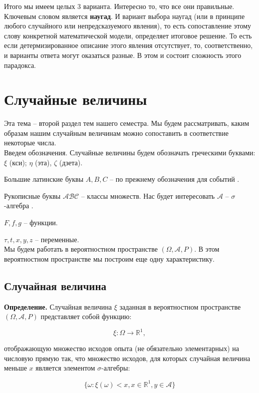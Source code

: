 \documentclass{article}
\begin{document}
\quad

Итого мы имеем целых 3 варианта. Интересно то, что все они правильные. Ключевым словом является \textbf{наугад}. И вариант выбора наугад (или в принципе любого случайного или непредсказуемого явления), то есть сопоставление этому слову конкретной математической модели, определяет итоговое решение. То есть если детермизированное описание этого явления отсутствует, то, соответственно, и варианты ответа могут оказаться разные. В этом и состоит сложность этого парадокса.

\section{Случайные величины}

Эта тема -- второй раздел тем нашего семестра. Мы будем рассматривать, каким образам нашим случайным величинам можно сопоставить в соответствие некоторые числа.
\\

Введем обозначения. Случайные величины будем обозначать греческими буквами: $\xi$ (кси); $\eta $ (эта), $\zeta $ (дзета).

Большие латинские буквы $A, B, C$ -- по прежнему обозначения для событий  .

Рукописные буквы $\mathcal{ABC}$ -- классы множеств. Нас будет интересовать $\mathcal{A}$ -- $\sigma$-алгебра  .

$F, f, g$ -- функции.

$\tau, t, x, y, z$ -- переменные.
\\

Мы будем работать в вероятностном пространстве $(\Omega, \mathcal{A}, P)$. В этом вероятностном пространстве мы построим еще одну характеристику.

\subsection{Случайная величина}

\textbf{Определение.} Случайная величина $\xi$ заданная в вероятностном пространстве $(\Omega, \mathcal{A}, P)$ представляет собой функцию:

$$ \xi : \Omega \rightarrow \mathbb{R}^1,$$

отображающую множество исходов опыта (не обязательно элементарных) на числовую прямую так, что множество исходов, для которых случайная величина меньше $x$ является элементом $\sigma$-алгебры:

$$\{\omega : \xi(\omega) < x, x \in \mathbb{R}^ 1, y \in \mathcal{A}\}$$
\end{document}
